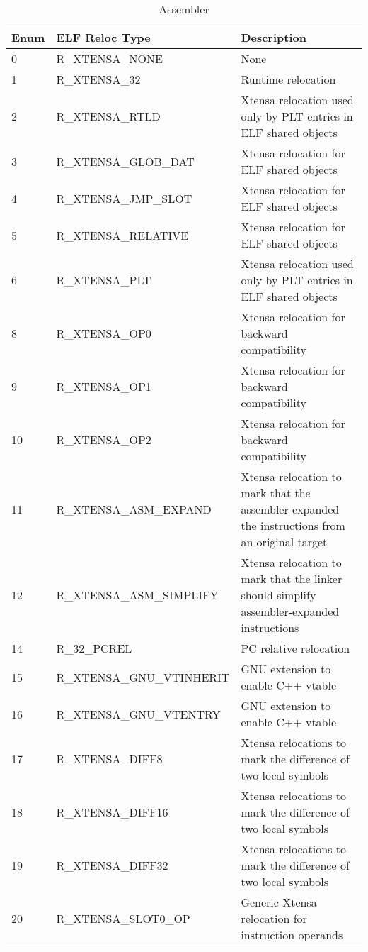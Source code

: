 
\begin{longtable}{|p{1cm}|p{6cm}|p{10cm}|}
	\caption{Assembler\label{long}}\\
	\hline
	Enum & ELF Reloc Type & Description \\
	\hline
	\endhead
	0 & R\_XTENSA\_NONE & None \\ \hline
	1 & R\_XTENSA\_32 & Runtime relocation \\ \hline
	2 & R\_XTENSA\_RTLD & Xtensa relocation used only by PLT entries in ELF shared objects \\ \hline
	3 & R\_XTENSA\_GLOB\_DAT & Xtensa relocation for ELF shared objects \\ \hline
	4 & R\_XTENSA\_JMP\_SLOT & Xtensa relocation for ELF shared objects \\ \hline
	5 & R\_XTENSA\_RELATIVE & Xtensa relocation for ELF shared objects \\ \hline
	6 & R\_XTENSA\_PLT & Xtensa relocation used only by PLT entries in ELF shared objects \\ \hline
	8 & R\_XTENSA\_OP0 & Xtensa relocation for backward compatibility \\ \hline
	9 & R\_XTENSA\_OP1 & Xtensa relocation for backward compatibility \\ \hline
	10 & R\_XTENSA\_OP2 & Xtensa relocation for backward compatibility \\ \hline
	11 & R\_XTENSA\_ASM\_EXPAND & Xtensa relocation to mark that the assembler expanded the instructions from an original target \\ \hline
	12 & R\_XTENSA\_ASM\_SIMPLIFY & Xtensa relocation to mark that the linker should simplify assembler-expanded instructions \\ \hline
	14 & R\_32\_PCREL & PC relative relocation \\ \hline
	15 & R\_XTENSA\_GNU\_VTINHERIT & GNU extension to enable C++ vtable\\ \hline
	16 & R\_XTENSA\_GNU\_VTENTRY & GNU extension to enable C++ vtable\\ \hline
	17 & R\_XTENSA\_DIFF8 & Xtensa relocations to mark the difference of two local symbols \\ \hline
	18 & R\_XTENSA\_DIFF16 & Xtensa relocations to mark the difference of two local symbols \\ \hline
	19 & R\_XTENSA\_DIFF32 & Xtensa relocations to mark the difference of two local symbols \\ \hline
	20 & R\_XTENSA\_SLOT0\_OP & Generic Xtensa relocation for instruction operands\\ \hline

\end{longtable}
